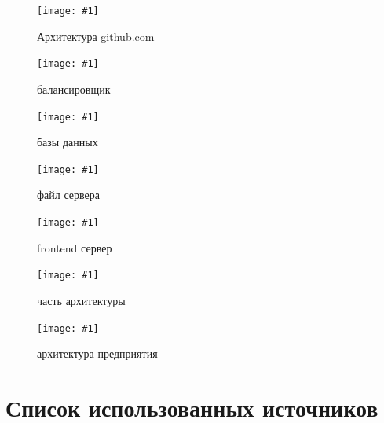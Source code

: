 \documentclass{article}
\begin{document}

\newcommand{\diaa}[2]{
    \begin{figure}[!h]
        \texttt{[image: \#1]}
        \caption{#2}
    \end{figure}
}

\diaa{diags/1.png}{Архитектура github.com \cite{github}}
\diaa{diags/2.png}{балансировщик \cite{github,nmap_github}}
\pagebreak
\diaa{diags/databases.png}{базы данных \cite{github}}
\diaa{diags/file-server.png}{файл сервера \cite{github}}
\pagebreak
\diaa{diags/frontend.png}{frontend сервер \cite{github}}
\pagebreak
\diaa{diags/github.png}{часть архитектуры \cite{github,nmap_github}}
\pagebreak
\diaa{diags/Diagram1.png}{архитектура предприятия \cite{nmap_build_server,nmap_prod_server,nmap_youtrack_server}}
\pagebreak

\pagebreak

\section{Список использованных источников}
\end{document}
